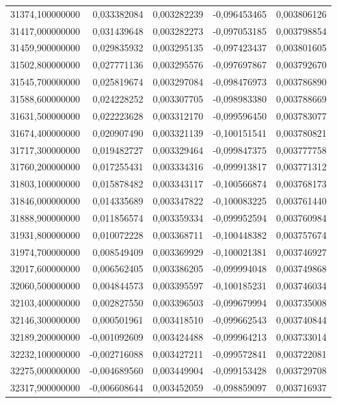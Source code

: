 \begin{longtable}{rrrrr}
31374,100000000 & 0,033382084 & 0,003282239 & -0,096453465 & 0,003806126\\
31417,000000000 & 0,031439648 & 0,003282273 & -0,097053185 & 0,003798854\\
31459,900000000 & 0,029835932 & 0,003295135 & -0,097423437 & 0,003801605\\
31502,800000000 & 0,027771136 & 0,003295576 & -0,097697867 & 0,003792670\\
31545,700000000 & 0,025819674 & 0,003297084 & -0,098476973 & 0,003786890\\
31588,600000000 & 0,024228252 & 0,003307705 & -0,098983380 & 0,003788669\\
31631,500000000 & 0,022223628 & 0,003312170 & -0,099596450 & 0,003783077\\
31674,400000000 & 0,020907490 & 0,003321139 & -0,100151541 & 0,003780821\\
31717,300000000 & 0,019482727 & 0,003329464 & -0,099847375 & 0,003777758\\
31760,200000000 & 0,017255431 & 0,003334316 & -0,099913817 & 0,003771312\\
31803,100000000 & 0,015878482 & 0,003343117 & -0,100566874 & 0,003768173\\
31846,000000000 & 0,014335689 & 0,003347822 & -0,100083225 & 0,003761440\\
31888,900000000 & 0,011856574 & 0,003359334 & -0,099952594 & 0,003760984\\
31931,800000000 & 0,010072228 & 0,003368711 & -0,100448382 & 0,003757674\\
31974,700000000 & 0,008549409 & 0,003369929 & -0,100021381 & 0,003746927\\
32017,600000000 & 0,006562405 & 0,003386205 & -0,099994048 & 0,003749868\\
32060,500000000 & 0,004844573 & 0,003395597 & -0,100185231 & 0,003746034\\
32103,400000000 & 0,002827550 & 0,003396503 & -0,099679994 & 0,003735008\\
32146,300000000 & 0,000501961 & 0,003418510 & -0,099662543 & 0,003740844\\
32189,200000000 & -0,001092609 & 0,003424488 & -0,099964213 & 0,003733014\\
32232,100000000 & -0,002716088 & 0,003427211 & -0,099572841 & 0,003722081\\
32275,000000000 & -0,004689560 & 0,003449904 & -0,099153428 & 0,003729708\\
32317,900000000 & -0,006608644 & 0,003452059 & -0,098859097 & 0,003716937\\

\end{longtable}
